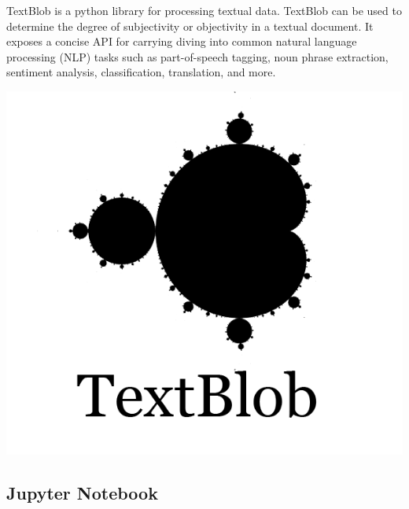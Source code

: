 \begin{minipage}{0.68\textwidth}
TextBlob is a python library for processing textual data. TextBlob can be used to determine the degree of subjectivity or objectivity in a textual document.
It exposes a concise API for carrying diving into common natural language processing (NLP) tasks such as part-of-speech tagging, noun phrase extraction, sentiment analysis, classification, translation, and more.\cite{ref43}
\end{minipage}%
%
\begin{minipage}{0.3\textwidth}
  \hspace*{.4cm}
  \includegraphics[width=\textwidth]{images/textblob_logo}
\end{minipage}


\subsection{Jupyter Notebook}

